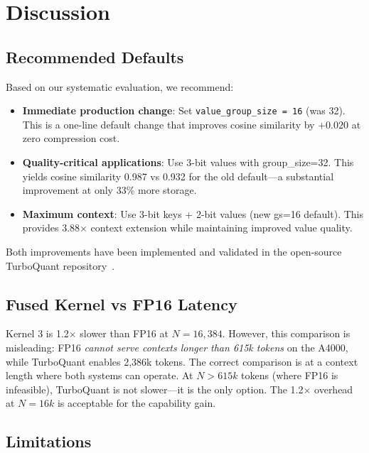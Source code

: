 \documentclass[10pt,twocolumn]{article}
\begin{document}
\section{Discussion}
\label{sec:discussion}

\subsection{Recommended Defaults}

Based on our systematic evaluation, we recommend:
\begin{itemize}
\item \textbf{Immediate production change}: Set \texttt{value\_group\_size = 16} (was 32). This is a one-line default change that improves cosine similarity by $+0.020$ at zero compression cost.
\item \textbf{Quality-critical applications}: Use 3-bit values with group\_size=32. This yields cosine similarity 0.987 vs 0.932 for the old default—a substantial improvement at only 33\% more storage.
\item \textbf{Maximum context}: Use 3-bit keys + 2-bit values (new gs=16 default). This provides 3.88$\times$ context extension while maintaining improved value quality.
\end{itemize}

Both improvements have been implemented and validated in the open-source TurboQuant repository~\cite{turboquant2025}.

\subsection{Fused Kernel vs FP16 Latency}

Kernel 3 is 1.2$\times$ slower than FP16 at $N = 16{,}384$. However, this comparison is misleading: FP16 \emph{cannot serve contexts longer than 615k tokens} on the A4000, while TurboQuant enables 2,386k tokens. The correct comparison is at a context length where both systems can operate. At $N > 615k$ tokens (where FP16 is infeasible), TurboQuant is not slower—it is the only option. The 1.2$\times$ overhead at $N = 16k$ is acceptable for the capability gain.

\subsection{Limitations}
\end{document}
